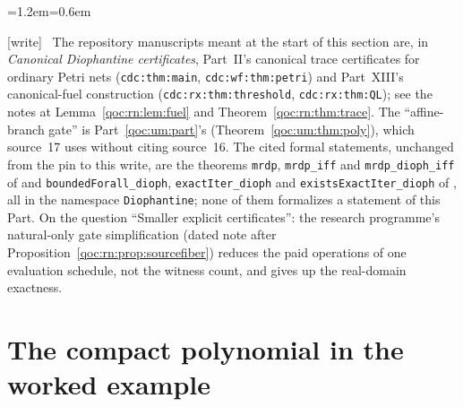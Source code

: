 \documentclass[11pt,letterpaper]{article}
\theoremstyle{definition}
\theoremstyle{remark}
\newcounter{qocsavedequation}\newcounter{qocsavedtable}\newcounter{qocsavedfigure}%
\newcommand{\wtag}{\textup{[write]}}
\newenvironment{writenote}{\par\smallskip\begin{list}{}{\leftmargin=1.2em\rightmargin=0.6em}\item[]\small\wtag\ }{\end{list}\smallskip}
\newcommand{\lab}[1]{\nolinkurl{#1}}
\begin{document}
\begin{writenote}
The repository manuscripts meant at the start of this section are, in \emph{Canonical Diophantine certificates}, Part~II's canonical trace certificates for ordinary Petri nets (\lab{cdc:thm:main}, \lab{cdc:wf:thm:petri}) and Part~XIII's canonical-fuel construction (\lab{cdc:rx:thm:threshold}, \lab{cdc:rx:thm:QL}); see the notes at Lemma~\ref{qoc:rn:lem:fuel} and Theorem~\ref{qoc:rn:thm:trace}. The ``affine-branch gate'' is Part~\ref{qoc:um:part}'s (Theorem~\ref{qoc:um:thm:poly}), which source~17 uses without citing source~16. The cited formal statements, unchanged from the pin to this write, are the theorems \texttt{mrdp}, \texttt{mrdp\_iff} and \texttt{mrdp\_dioph\_iff} of  and \texttt{boundedForall\_dioph}, \texttt{exactIter\_dioph} and \texttt{existsExactIter\_dioph} of , all in the namespace \texttt{Diophantine}; none of them formalizes a statement of this Part. On the question ``Smaller explicit certificates'': the research programme's natural-only gate simplification (dated note after Proposition~\ref{qoc:rn:prop:sourcefiber}) reduces the paid operations of one evaluation schedule, not the witness count, and gives up the real-domain exactness.
\end{writenote}


\setcounter{equation}{\value{qocsavedequation}}\setcounter{table}{\value{qocsavedtable}}\setcounter{figure}{\value{qocsavedfigure}}

\appendix

\section{The compact polynomial in the worked example}\label{qoc:mp:app:expanded}
\end{document}
